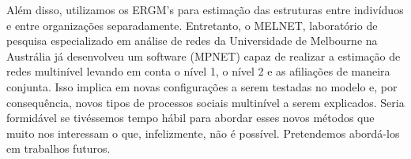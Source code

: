 \documentclass[a4paper, 12pt, openright, oneside, german, french, english, brazil]{abntex2}
\begin{document}
	Além disso, utilizamos os ERGM's para estimação das estruturas entre indivíduos e entre organizações separadamente. Entretanto, o MELNET, laboratório de pesquisa especializado em análise de redes da Universidade de Melbourne na Austrália já desenvolveu um software (MPNET) capaz de realizar a estimação de redes multinível levando em conta o nível 1, o nível 2 e as afiliações de maneira conjunta. Isso implica em novas configurações a serem testadas no modelo e, por consequência, novos tipos de processos sociais multinível a serem explicados. Seria formidável se tivéssemos tempo hábil para abordar esses novos métodos que muito nos interessam o que, infelizmente, não é possível. Pretendemos abordá-los em trabalhos futuros.
\end{document}
